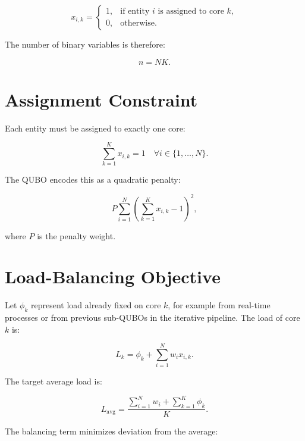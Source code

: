\documentclass[12pt,a4paper,oneside]{report}
\begin{document}
\begin{equation}
  x_{i,k} =
  \begin{cases}
    1, & \text{if entity } i \text{ is assigned to core } k,\\
    0, & \text{otherwise.}
  \end{cases}
\end{equation}

The number of binary variables is therefore:

\begin{equation}
  n = N K .
\end{equation}

\section{Assignment Constraint}

Each entity must be assigned to exactly one core:

\begin{equation}
  \sum_{k=1}^{K} x_{i,k} = 1
  \quad \forall i \in \{1,\dots,N\}.
\end{equation}

The QUBO encodes this as a quadratic penalty:

\begin{equation}
  P \sum_{i=1}^{N} \left(\sum_{k=1}^{K} x_{i,k} - 1\right)^2 ,
\end{equation}

where \(P\) is the penalty weight.

\section{Load-Balancing Objective}

Let \(\phi_k\) represent load already fixed on core \(k\), for example from
real-time processes or from previous sub-QUBOs in the iterative pipeline. The
load of core \(k\) is:

\begin{equation}
  L_k = \phi_k + \sum_{i=1}^{N} w_i x_{i,k}.
\end{equation}

The target average load is:

\begin{equation}
  L_{\text{avg}} = \frac{\sum_{i=1}^{N} w_i + \sum_{k=1}^{K}\phi_k}{K}.
\end{equation}

The balancing term minimizes deviation from the average:
\end{document}
